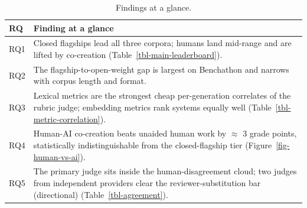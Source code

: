 \begin{table}[t]
\centering
\footnotesize
\setlength{\tabcolsep}{4pt}
\begin{tabular}{@{}p{}p{}@{}}
\toprule
\textbf{RQ} & \textbf{Finding at a glance} \\
\midrule
RQ1 & Closed flagships lead all three corpora; humans land mid-range and are lifted by co-creation (Table~\ref{tbl-main-leaderboard}). \\
RQ2 & The flagship-to-open-weight gap is largest on Benchathon and narrows with corpus length and format. \\
RQ3 & Lexical metrics are the strongest cheap per-generation correlates of the rubric judge; embedding metrics rank systems equally well (Table~\ref{tbl-metric-correlation}). \\
RQ4 & Human-AI co-creation beats unaided human work by $\approx$ 3 grade points, statistically indistinguishable from the closed-flagship tier (Figure~\ref{fig-human-vs-ai}). \\
RQ5 & The primary judge sits inside the human-disagreement cloud; two judges from independent providers clear the reviewer-substitution bar (directional) (Table~\ref{tbl-agreement}). \\
\bottomrule
\end{tabular}
\caption{Findings at a glance.}
\label{tbl-findings}
\end{table}
